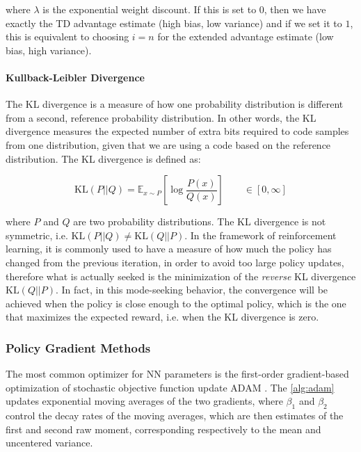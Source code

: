 where $\lambda$ is the exponential weight discount. If this is set to $0$, then we have exactly the \ac{TD} advantage estimate (high bias, low variance) and if we set it to $1$, this is equivalent to choosing $i=n$ for the extended advantage estimate (low bias, high variance).

\paragraph{Kullback-Leibler Divergence} The \ac{KL} divergence is a measure of how one probability distribution is different from a second, reference probability distribution. In other words, the \ac{KL} divergence measures the expected number of extra bits required to code samples from one distribution, given that we are using a code based on the reference distribution. The \ac{KL} divergence is defined as:

\begin{equation}
    \mathrm{KL}(P||Q) = \mathbb{E} _{x \sim P} \left[ \log \frac{P(x)}{Q(x)} \right] \qquad \in \left[0, \infty \right]
\end{equation}

where $P$ and $Q$ are two probability distributions. The \ac{KL} divergence is not symmetric, i.e. $\mathrm{KL}(P||Q) \neq \mathrm{KL}(Q||P)$. In the framework of reinforcement learning, it is commonly used to have a measure of how much the policy has changed from the previous iteration, in order to avoid too large policy updates, therefore what is actually seeked is the minimization of the \textit{reverse} \ac{KL} divergence $\mathrm{KL}(Q||P)$. In fact, in this mode-seeking behavior, the convergence will be achieved when the policy is close enough to the optimal policy, which is the one that maximizes the expected reward, i.e. when the \ac{KL} divergence is zero.

\subsubsection{Policy Gradient Methods}

The most common optimizer for \ac{NN} parameters is the first-order gradient-based optimization of stochastic objective function update ADAM \citep{kingma_adam_2017}. The \cref{alg:adam}
updates exponential moving averages of the two gradients, where $\beta_1$ and $\beta_2$ control the decay rates of the moving averages, which are then estimates of the first and second raw moment, corresponding respectively to the mean and uncentered variance.

